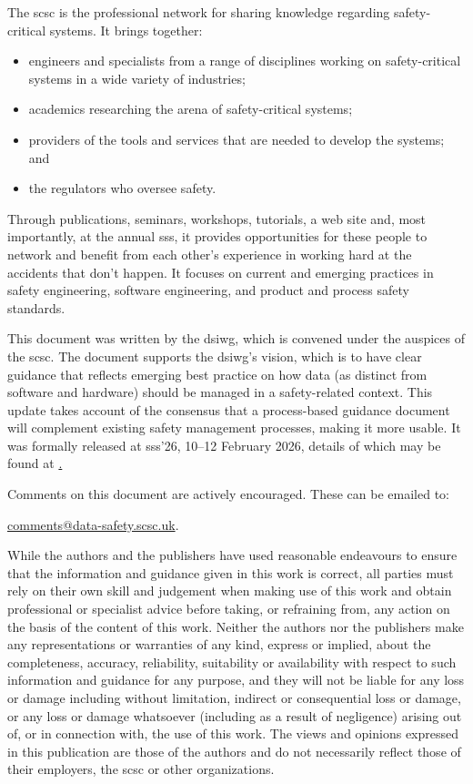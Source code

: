 \clearpage
\pagestyle{ContinuationInsideFrontCover}
The \gls{scsc} is the professional network for sharing knowledge regarding safety-critical systems. It brings together: 
\begin{itemize}
	\item engineers and specialists from a range of disciplines working on safety-critical systems in a wide variety of industries;
	\item academics researching the arena of safety-critical systems;
	\item providers of the tools and services that are needed to develop the systems; and
	\item the regulators who oversee safety.
\end{itemize}

Through publications, seminars, workshops, tutorials, a web site and, most importantly, at the annual \gls{sss}, it provides opportunities for these people to network and benefit from each other’s experience in working hard at the accidents that don’t happen. It focuses on current and emerging practices in safety engineering, software engineering, and product and process safety standards.

This document was written by the \gls{dsiwg}, which is convened under the auspices of the \gls{scsc}. The document supports the \gls{dsiwg}'s vision, which is to have clear guidance that reflects emerging best practice on how data (as distinct from software and hardware) should be managed in a safety-related context. This update takes account of the consensus that a process-based guidance document will complement existing safety management processes, making it more usable. It was formally released at
\gls{sss}'26, 10--12 February 2026,
details of which may be found at
\href{https://scsc.uk/sss}.

Comments on this document are actively encouraged. These can be emailed to: 
\begin{center}
	\href{mailto:comments@data-safety.scsc.uk}{comments@data-safety.scsc.uk}.
\end{center}

While the authors and the publishers have used reasonable endeavours to ensure that the information and guidance given in this work is correct, all parties must rely on their own skill and judgement when making use of this work and obtain professional or specialist advice before taking, or refraining from, any action on the basis of the content of this work. Neither the authors nor the publishers make any representations or warranties of any kind, express or implied, about the completeness, accuracy, reliability, suitability or availability with respect to such information and guidance for any purpose, and they will not be liable for any loss or damage including without limitation, indirect or consequential loss or damage, or any loss or damage whatsoever (including as a result of negligence) arising out of, or in connection with, the use of this work. The views and opinions expressed in this publication are those of the authors and do not necessarily reflect those of their employers, the \gls{scsc} or other organizations.

